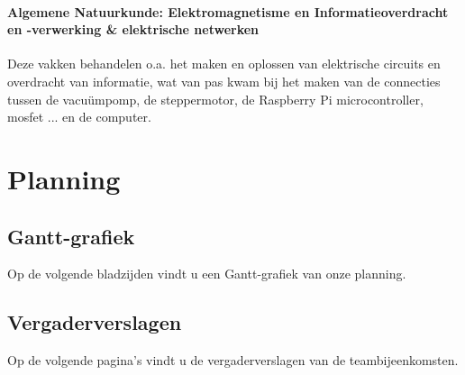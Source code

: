 \documentclass[a4paper,twoside,kulak]{kulakreport} %
\begin{document}
\paragraph{Algemene Natuurkunde: Elektromagnetisme en Informatieoverdracht en -verwerking \& elektrische netwerken}

Deze vakken behandelen o.a. het maken en oplossen van elektrische circuits en overdracht van informatie, wat van pas kwam bij het maken van de connecties tussen de vacuümpomp, de steppermotor, de Raspberry Pi microcontroller, mosfet ... en de computer.

\clearpage

\section*{Planning}
\subsection*{Gantt-grafiek}
Op de volgende bladzijden vindt u een Gantt-grafiek van onze planning.





\subsection*{Vergaderverslagen}
Op de volgende pagina's vindt u de vergaderverslagen van de teambijeenkomsten.









\end{document}
